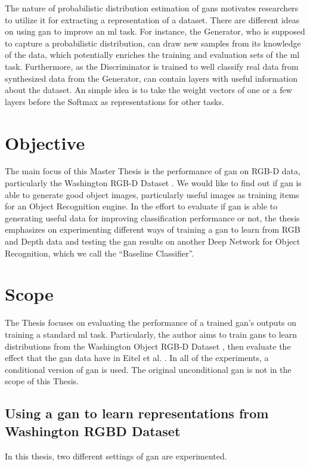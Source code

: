 The nature of probabilistic distribution estimation of \acrshort{gan}s motivates
researchers to utilize it for extracting a representation of a dataset. There are
different ideas on using \acrshort{gan} to improve an \acrshort{ml} task. For instance,
the Generator, who is supposed to capture a probabilistic distribution, can draw new
samples from its knowledge of the data, which potentially enriches the training and
evaluation sets of the \acrshort{ml} task. Furthermore, as the Discriminator is trained to
well classify real data from synthesized data from the Generator, can contain layers with
useful information about the dataset. An simple idea is to take the weight vectors of one
or a few layers before the Softmax as representations for other tasks.

\section{Objective\label{sec:objective}}
The main focus of this Master Thesis is the performance of \acrfull{gan} on RGB-D data,
particularly the Washington RGB-D Dataset \cite{washington_rgbd}. We would like to
find out if \acrshort{gan} is able to generate good object images, particularly useful
images as training items for an Object Recognition engine. In the effort to evaluate if
\acrshort{gan} is able to generating useful data for improving classification performance
or not, the thesis emphasizes on experimenting different ways of training a \acrshort{gan}
to learn from RGB and Depth data and testing the \acrshort{gan} results on another Deep
Network for Object Recognition, which we call the ``Baseline Classifier''.

\section{Scope\label{sec:scope}}
The Thesis focuses on evaluating the performance of a trained \acrshort{gan}'s outputs on
training a standard \acrshort{ml} task. Particularly, the author aims to train
\acrshort{gan}s to learn distributions from the Washington Object RGB-D Dataset
\cite{washington_rgbd}, then evaluate the effect that the \acrshort{gan} data
have in Eitel et al. \cite{eitel}. In all of the experiments, a conditional version
of \acrshort{gan} is used. The original unconditional \acrshort{gan} is not in the scope
of this Thesis.  

\subsection{Using a \acrshort{gan} to learn representations from Washington RGBD Dataset} 
In this thesis, two different settings of \acrshort{gan} are experimented. 

